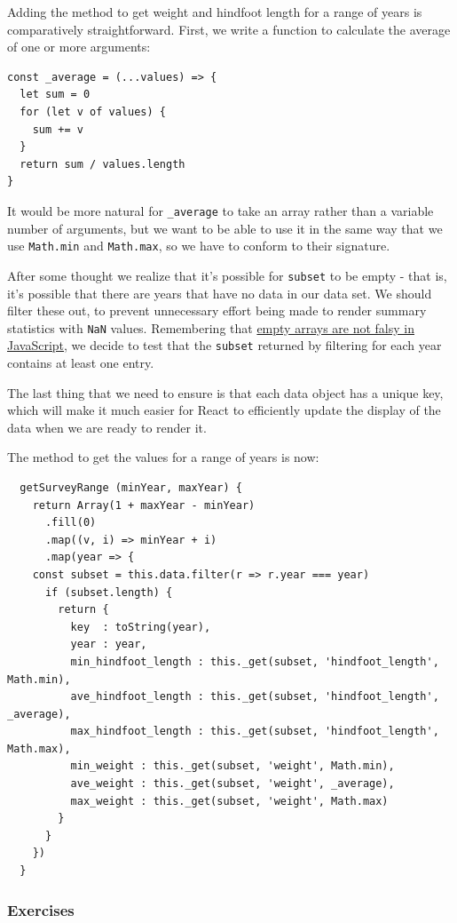 Adding the method to get weight and hindfoot length for a range of years
is comparatively straightforward. First, we write a function to
calculate the average of one or more arguments:

\begin{verbatim}
const _average = (...values) => {
  let sum = 0
  for (let v of values) {
    sum += v
  }
  return sum / values.length
}
\end{verbatim}

It would be more natural for \texttt{\_average} to take an array rather
than a variable number of arguments, but we want to be able to use it in
the same way that we use \texttt{Math.min} and \texttt{Math.max}, so we
have to conform to their signature.

After some thought we realize that it's possible for \texttt{subset} to
be empty - that is, it's possible that there are years that have no data
in our data set. We should filter these out, to prevent unnecessary
effort being made to render summary statistics with \texttt{NaN} values.
Remembering that \protect\hyperlink{s:basics}{empty arrays are not falsy
in JavaScript}, we decide to test that the \texttt{subset} returned by
filtering for each year contains at least one entry.

The last thing that we need to ensure is that each data object has a
unique key, which will make it much easier for React to efficiently
update the display of the data when we are ready to render it.

The method to get the values for a range of years is now:

\begin{verbatim}
  getSurveyRange (minYear, maxYear) {
    return Array(1 + maxYear - minYear)
      .fill(0)
      .map((v, i) => minYear + i)
      .map(year => {
    const subset = this.data.filter(r => r.year === year)
      if (subset.length) {
        return {
          key  : toString(year),
          year : year,
          min_hindfoot_length : this._get(subset, 'hindfoot_length', Math.min),
          ave_hindfoot_length : this._get(subset, 'hindfoot_length', _average),
          max_hindfoot_length : this._get(subset, 'hindfoot_length', Math.max),
          min_weight : this._get(subset, 'weight', Math.min),
          ave_weight : this._get(subset, 'weight', _average),
          max_weight : this._get(subset, 'weight', Math.max)
        }
      }
    })
  }
\end{verbatim}

\subsubsection{Exercises}\label{s:data-exercises}

